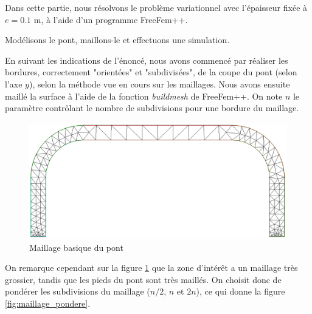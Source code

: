 
Dans cette partie, nous résolvons le problème variationnel avec l'épaisseur fixée à $e=0.1$ m, à l'aide d'un programme FreeFem++.


\begin{problem}{3}
    Modélisons le pont, maillons-le et effectuons une simulation.
\end{problem}


    En suivant les indications de l'énoncé, nous avons commencé par réaliser les bordures, correctement "orientées" et "subdivisées", de la coupe du pont (selon l'axe $y$),
    selon la méthode vue en cours sur les maillages.%
    Nous avons ensuite maillé la surface à l'aide de la fonction \emph{buildmesh} de FreeFem++.
    On note $n$ le paramètre contrôlant le nombre de subdivisions pour une bordure du maillage.

    \begin{figure}      
        \begin{center}
        
            \includegraphics[width=12cm]{imgs/all_maillage_default.PNG}
            \caption{Maillage basique du pont}
            \label{fig:maillage_default}
        
        \end{center}
    \end{figure}

    On remarque cependant sur la figure \ref{fig:maillage_default} que la zone d'intérêt a un maillage très grossier, tandis que les pieds du pont sont très maillés. 
    On choisit donc de pondérer les subdivisions du maillage ($n/2$, $n$ et $2n$), ce qui donne la figure \ref{fig:maillage_pondere}.
    
